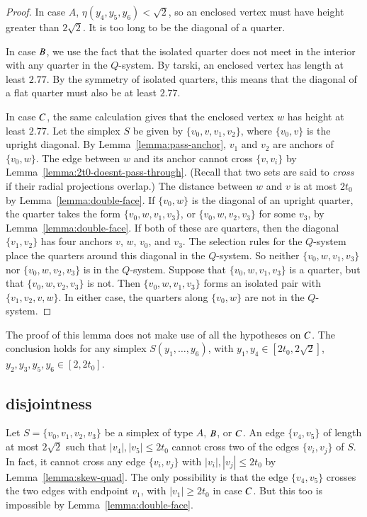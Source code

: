 \begin{proof}
In case $A$, $\eta(y_4,y_5,y_6)<\sqrt{2}$, so an enclosed vertex
must have height greater than $2\sqrt{2}$.  It is too long to be
the diagonal of a quarter.

In case $B$, we use the fact that the isolated quarter does not
meet in the interior with any quarter in the $Q$-system. 
By tarski, an
enclosed vertex has length at least $2.77$.
By the symmetry of isolated quarters, this means that the diagonal
of a flat quarter must also be at least $2.77$.

In case $C$, the same calculation gives that the enclosed vertex
$w$ has height at least $2.77$.  Let the simplex $S$ be given by
$\{v_0,v,v_1,v_2\}$, where $\{v_0,v\}$ is the upright diagonal. By
Lemma~\ref{lemma:pass-anchor}, $v_1$ and $v_2$ are anchors of
$\{v_0,w\}$. The edge between $w$ and its anchor cannot cross
$\{v,v_i\}$ by Lemma~\ref{lemma:2t0-doesnt-pass-through}. (Recall
that two sets are said to {\it cross\/} if their radial
projections overlap.) The distance between $w$ and $v$ is at most
$2t_0$ by Lemma~\ref{lemma:double-face}. If $\{v_0,w\}$ is the
diagonal of an upright quarter, the quarter takes the form
$\{v_0,w,v_1,v_3\}$, or $\{v_0,w,v_2,v_3\}$ for some $v_3$, by
Lemma~\ref{lemma:double-face}. If both of these are quarters, then
the diagonal $\{v_1,v_2\}$ has four anchors $v$, $w$, $v_0$, and
$v_3$. The selection rules for the $Q$-system place the quarters
around this diagonal in the $Q$-system. So neither $\{v_0,w,v_1,v_3\}$
nor $\{v_0,w,v_2,v_3\}$ is in the $Q$-system. Suppose that
$\{v_0,w,v_1,v_3\}$ is a quarter, but that $\{v_0,w,v_2,v_3\}$ is not.
Then $\{v_0,w,v_1,v_3\}$ forms an isolated pair with $\{v_1,v_2,v,w\}$.
In either case, the quarters along $\{v_0,w\}$ are not in the
$Q$-system.
\end{proof}

\begin{remark}  The proof of this lemma does not make use of all the hypotheses
on $C$.  The conclusion holds for any simplex
$S(y_1,\ldots,y_6)$, with $y_1,y_4\in[2t_0,2\sqrt{2}]$,
$y_2,y_3,y_5,y_6\in[2,2t_0]$.
\end{remark}

\subsection{disjointness}%

Let $S=\{v_0,v_1,v_2,v_3\}$ be a simplex of type $A$, $B$, or
$C$. An edge $\{v_4,v_5\}$ of length at most $2\sqrt{2}$ such
that $|v_4|,|v_5|\le 2t_0$ cannot cross two of the edges
$\{v_i,v_j\}$ of $S$.  In fact, it cannot cross any edge $\{v_i,v_j\}$
with $|v_i|,|v_j|\le 2t_0$ by Lemma~\ref{lemma:skew-quad}.  The
only possibility is that the edge $\{v_4,v_5\}$ crosses the two
edges with endpoint $v_1$, with $|v_1|\ge2t_0$ in case $C$.  But
this too is impossible by Lemma~\ref{lemma:double-face}.


